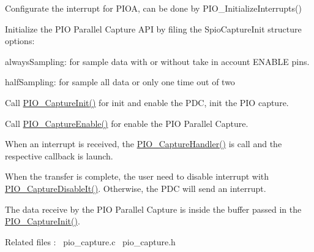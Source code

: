 \begin{DoxyEnumerate}
\item Configurate the interrupt for P\+I\+OA, can be done by P\+I\+O\+\_\+\+Initialize\+Interrupts()
\item Initialize the P\+IO Parallel Capture A\+PI by filing the Spio\+Capture\+Init structure options\+:
\begin{DoxyItemize}
\item always\+Sampling\+: for sample data with or without take in account E\+N\+A\+B\+LE pins.
\item half\+Sampling\+: for sample all data or only one time out of two
\end{DoxyItemize}
\item Call \mbox{\hyperlink{pio__capture_8c_a2bd58aa646eab74ad61f326639c402bf}{P\+I\+O\+\_\+\+Capture\+Init()}} for init and enable the P\+DC, init the P\+IO capture.
\item Call \mbox{\hyperlink{pio__capture_8c_aab4d2625e0e7026c0471dfe838cb57a2}{P\+I\+O\+\_\+\+Capture\+Enable()}} for enable the P\+IO Parallel Capture.
\item When an interrupt is received, the \mbox{\hyperlink{pio__capture_8c_adaf2253c76b14e77d0dbca31f2c93690}{P\+I\+O\+\_\+\+Capture\+Handler()}} is call and the respective callback is launch.
\item When the transfer is complete, the user need to disable interrupt with \mbox{\hyperlink{pio__capture_8c_aff2746080dee414844c97c193cdbca28}{P\+I\+O\+\_\+\+Capture\+Disable\+It()}}. Otherwise, the P\+DC will send an interrupt.
\item The data receive by the P\+IO Parallel Capture is inside the buffer passed in the \mbox{\hyperlink{pio__capture_8c_a2bd58aa646eab74ad61f326639c402bf}{P\+I\+O\+\_\+\+Capture\+Init()}}.
\end{DoxyEnumerate}

Related files \+:~\newline
pio\+\_\+capture.\+c~\newline
 pio\+\_\+capture.\+h~\newline
 